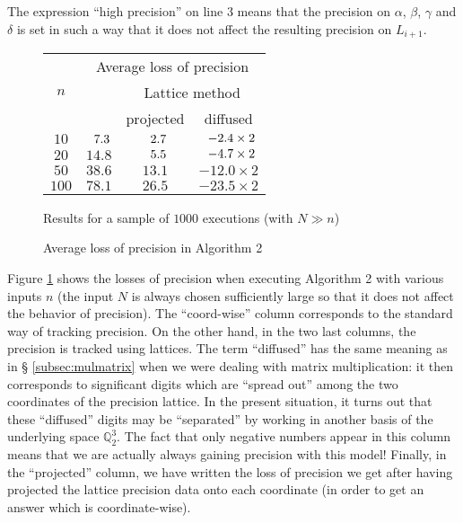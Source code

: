 \documentclass{sig-alternate}
\newcommand{\Q}{\mathbb Q}
\begin{document}
\noindent
The expression ``high precision'' on line 3 means that the precision on 
$\alpha$, $\beta$, $\gamma$ and $\delta$ is set in such a way that it 
does not affect the resulting precision on $L_{i+1}$.
%
\begin{figure}
\begin{center}
\renewcommand{\arraystretch}{1.2}
\begin{tabular}{|c|c|c|c|}
\hline
\multirow{3}{*}{\hspace{0.2cm}$n$\hspace{0.2cm}} & 
\multicolumn{3}{|c|}{Average loss of precision} \\
\cline{2-4}
& \raisebox{-0.05cm}{Coord-wise} & 
\multicolumn{2}{|c|}{Lattice method} \\
\cline{3-4}
& \raisebox{0.04cm}{method} & 
\hspace{0.2cm}projected\hspace{0.2cm} & 
\hspace{0.2cm}diffused\hspace{0.2cm} \\
\hline 
$10$ & $\hphantom{0}7.3$ & $\hphantom{0}2.7$ & $\hphantom{0}{-}2.4 \times 2$ \\
$20$ & $14.8$ & $\hphantom{0}5.5$ & $\hphantom{0}{-}4.7 \times 2$ \\
$50$ & $38.6$ & $13.1$ & $-12.0 \times 2$ \\
$100$ & $78.1$ & $26.5$ & $-23.5 \times 2$ \\
\hline
\end{tabular}

\smallskip

{\small
Results for a sample of $1000$ executions (with $N \gg n$)}
\end{center}
\renewcommand{\arraystretch}{1}

\vspace{-0.3cm}

\caption{Average loss of precision in Algorithm 2}
\label{fig:vectorspace}
\end{figure}
%
Figure \ref{fig:vectorspace} shows the losses of precision when
executing Algorithm 2 with various inputs $n$ (the input $N$ is
always chosen sufficiently large so that it does not affect the
behavior of precision). The ``coord-wise'' column corresponds to
the standard way of tracking precision. On the other hand, in the two 
last columns, the precision is tracked using lattices. The term 
``diffused'' has the same meaning as in \S 
\ref{subsec:mulmatrix} when we were dealing with matrix multiplication: 
it then corresponds to significant digits which are ``spread out'' among 
the two coordinates of the precision lattice. In the present situation,
it turns out that these ``diffused'' digits may be ``separated'' by
working in another basis of the underlying space $\Q_2^3$.
The fact that only negative numbers appear in this column means that we 
are actually always gaining precision with this model! Finally, in the 
``projected'' column, we have written the loss of precision we get after 
having projected the lattice precision data onto each coordinate (in 
order to get an answer which is coordinate-wise).
\end{document}
